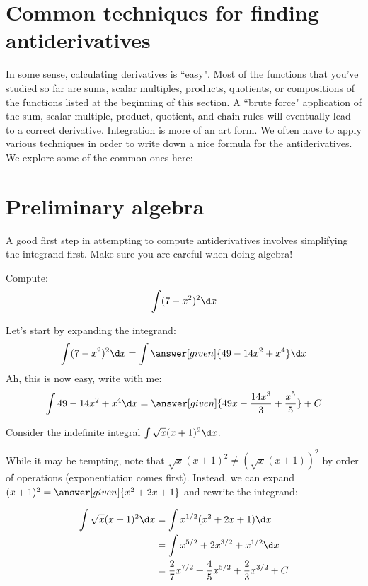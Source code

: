 \documentclass[nooutcomes]{ximera}
\begin{document}



\section{Common techniques for finding antiderivatives}
In some sense, calculating derivatives is ``easy".  Most of the functions that you've studied so far are sums, scalar multiples, products, quotients, or compositions of the functions listed at the beginning of this section.  A ``brute force" application of the sum, scalar multiple, product, quotient, and chain rules will eventually lead to a correct derivative.  Integration is more of an art form.  We often have to apply various techniques in order to write down a nice formula for the antiderivatives. We explore some of the common ones here:

\section{Preliminary algebra}

A good first step in attempting to compute antiderivatives involves simplifying the integrand first.  Make sure you are careful when doing algebra!



\begin{example}
  Compute:
  \[
  \int (7-x^2)^2 \d x
  \]
  \begin{explanation}
    Let's start by expanding the integrand:
    \[
    \int (7-x^2)^2 \d x  = \int \answer[given]{49 - 14x^2 + x^4} \d x
    \]
    Ah, this is now easy, write with me:
    \[
    \int 49 - 14x^2 + x^4 \d x = \answer[given]{49x - \frac{14 x^3}{3} + \frac{x^5}{5}} + C
    \]
  \end{explanation}
\end{example}

\begin{example}
Consider the indefinite integral $\int \sqrt{x}(x+1)^2 \d x$.  

While it may be tempting, note that $\sqrt{x}(x+1)^2 \neq (\sqrt{x}(x+1))^2$ by order of operations (exponentiation comes first). Instead, we can expand $(x+1)^2 = \answer[given]{x^2+2x+1}$ and rewrite the integrand:

\begin{align*}
\int \sqrt{x}(x+1)^2 \d x &= \int x^{1/2} (x^2+2x+1) \d x \\
&=  \int x^{5/2}+2x^{3/2}+x^{1/2} \d x \\
&= \frac{2}{7} x^{7/2}+\frac{4}{5}x^{5/2}+\frac{2}{3}x^{3/2}+C
\end{align*}

\end{example}
 
\end{document}
